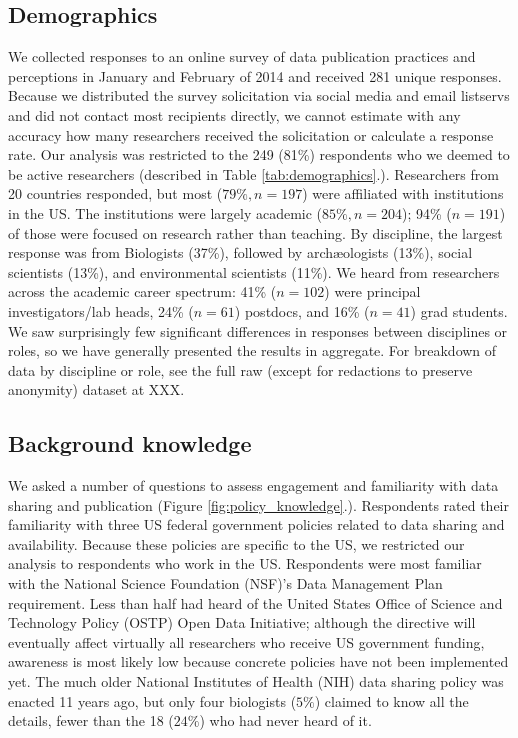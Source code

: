 \documentclass[10pt]{article}
\begin{document}
\subsection*{Demographics}

We collected responses to an online survey of data publication practices and perceptions in January and February of 2014 and received 281 unique responses.
Because we distributed the survey solicitation via social media and email listservs and did not contact most recipients directly, we cannot estimate with any accuracy how many researchers received the solicitation or calculate a response rate.
Our analysis was restricted to the 249 (81\%) respondents who we deemed to be active researchers (described in Table \ref{tab:demographics}.).
Researchers from 20 countries responded, but most ($79\%, n=197$) were affiliated with institutions in the US.
The institutions were largely academic ($85\%, n=204$); 94\% ($n=191$) of those were focused on research rather than teaching. 
By discipline, the largest response was from Biologists (37\%), followed by arch{\ae}ologists (13\%), social scientists (13\%), and environmental scientists (11\%).
We heard from researchers across the academic career spectrum: 41\% ($n=102$) were principal investigators/lab heads, 24\% ($n=61$) postdocs, and 16\% ($n=41$) grad students.
We saw surprisingly few significant differences in responses between disciplines or roles, so we have generally presented the results in aggregate.
For breakdown of data by discipline or role, see the full raw (except for redactions to preserve anonymity) dataset at XXX. %

\subsection*{Background knowledge}

We asked a number of questions to assess engagement and familiarity with data sharing and publication (Figure \ref{fig:policy_knowledge}.).
Respondents rated their familiarity with three US federal government policies related to data sharing and availability.
Because these policies are specific to the US, we restricted our analysis to respondents who work in the US.
Respondents were most familiar with the National Science Foundation (NSF)'s Data Management Plan requirement\cite{national_science_foundation_gpg_2011}.
Less than half had heard of the United States Office of Science and Technology Policy (OSTP) Open Data Initiative\cite{obama_making_2013}; although the directive will eventually affect virtually all researchers who receive US government funding, awareness is most likely low because concrete policies have not been implemented yet. 
The much older National Institutes of Health (NIH) data sharing policy\cite{national_institutes_of_health_final_2003} was enacted 11 years ago, but only four biologists ($5\%$) claimed to know all the details, fewer than the 18 ($24\%$) who had never heard of it.
\end{document}

